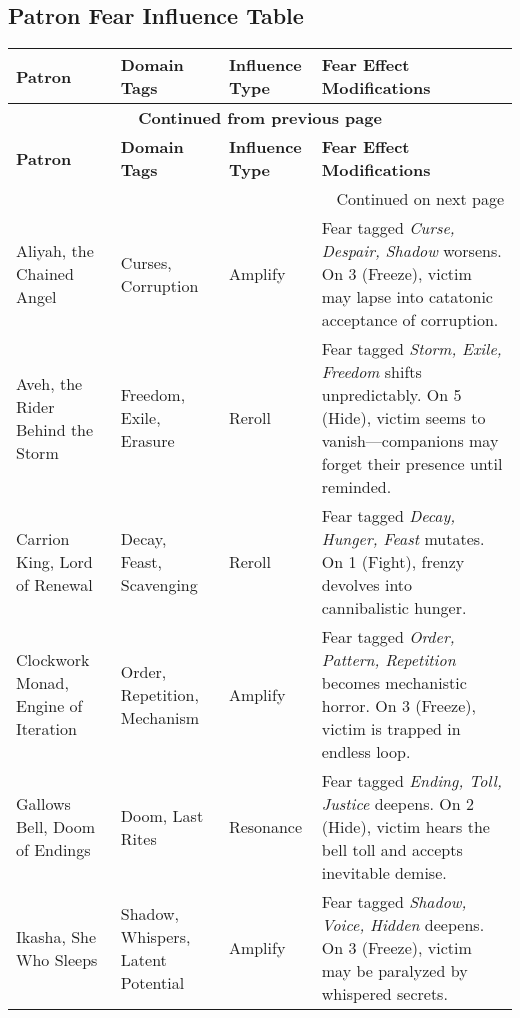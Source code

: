 \subsection{Patron Fear Influence Table}
\label{subsec:patron-fear-table}
\begin{longtable}{@{}p{3.2cm}p{4.5cm}p{2.8cm}p{5.9cm}@{}}
\toprule
\textbf{Patron} & \textbf{Domain Tags} & \textbf{Influence Type} & \textbf{Fear Effect Modifications} \\
\midrule
\endfirsthead

\multicolumn{4}{c}{{\bfseries Continued from previous page}} \\
\toprule
\textbf{Patron} & \textbf{Domain Tags} & \textbf{Influence Type} & \textbf{Fear Effect Modifications} \\
\midrule
\endhead

\midrule
\multicolumn{4}{r}{{Continued on next page}} \\
\endfoot

\bottomrule
\endlastfoot

Aliyah, the Chained Angel & Curses, Corruption & Amplify & 
Fear tagged \emph{Curse, Despair, Shadow} worsens. On 3 (Freeze), victim may lapse into catatonic acceptance of corruption. \\

Aveh, the Rider Behind the Storm & Freedom, Exile, Erasure & Reroll & 
Fear tagged \emph{Storm, Exile, Freedom} shifts unpredictably. On 5 (Hide), victim seems to vanish—companions may forget their presence until reminded. \\

Carrion King, Lord of Renewal & Decay, Feast, Scavenging & Reroll & 
Fear tagged \emph{Decay, Hunger, Feast} mutates. On 1 (Fight), frenzy devolves into cannibalistic hunger. \\

Clockwork Monad, Engine of Iteration & Order, Repetition, Mechanism & Amplify & 
Fear tagged \emph{Order, Pattern, Repetition} becomes mechanistic horror. On 3 (Freeze), victim is trapped in endless loop. \\

Gallows Bell, Doom of Endings & Doom, Last Rites & Resonance & 
Fear tagged \emph{Ending, Toll, Justice} deepens. On 2 (Hide), victim hears the bell toll and accepts inevitable demise. \\

Ikasha, She Who Sleeps & Shadow, Whispers, Latent Potential & Amplify & 
Fear tagged \emph{Shadow, Voice, Hidden} deepens. On 3 (Freeze), victim may be paralyzed by whispered secrets. \\


\end{longtable}
